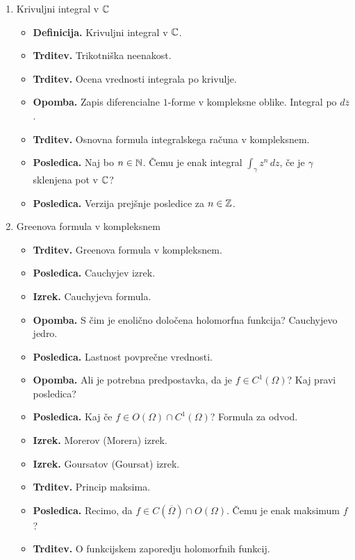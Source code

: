 \begin{enumerate}
    \item Krivuljni integral v \(\mathbb{C}\)
    \begin{itemize}
        \item \textbf{Definicija.} Krivuljni integral v \(\mathbb{C}\).
        \item \textbf{Trditev.} Trikotniška neenakost.
        \item \textbf{Trditev.} Ocena vrednosti integrala po krivulje.
        \item \textbf{Opomba.} Zapis diferencialne \(1\)-forme v kompleksne oblike. Integral po \(d\overline{z}\).
        \item \textbf{Trditev.} Osnovna formula integralskega računa v kompleksnem.
        \item \textbf{Posledica.} Naj bo \(n \in \mathbb{N}\). Čemu je enak integral \(\int_{\gamma} z^n \, dz\), če je \(\gamma\) sklenjena pot v \(\mathbb{C}\)?
        \item \textbf{Posledica.} Verzija prejšnje posledice za \(n \in \mathbb{Z}\).
    \end{itemize}

    \item Greenova formula v kompleksnem
    \begin{itemize}
        \item \textbf{Trditev.} Greenova formula v kompleksnem.
        \item \textbf{Posledica.} Cauchyjev izrek.
        \item \textbf{Izrek.} Cauchyjeva formula.
        \item \textbf{Opomba.} S čim je enolično določena holomorfna funkcija? Cauchyjevo jedro.
        \item \textbf{Posledica.} Lastnost povprečne vrednosti.
        \item \textbf{Opomba.} Ali je potrebna predpostavka, da je \(f \in C^1(\Omega)\)? Kaj pravi posledica?
        \item \textbf{Posledica.} Kaj če \(f \in O(\Omega) \cap C^1(\Omega)\)? Formula za odvod.
        \item \textbf{Izrek.} Morerov (Morera) izrek.
        \item \textbf{Izrek.} Goursatov (Goursat) izrek. 
        \item \textbf{Trditev.} Princip maksima.
        \item \textbf{Posledica.}  Recimo, da \(f \in C(\overline{\Omega}) \cap O(\Omega)\). Čemu je enak maksimum \(f\)?
        \item \textbf{Trditev.} O funkcijskem zaporedju holomorfnih funkcij.
    \end{itemize}


\end{enumerate}
